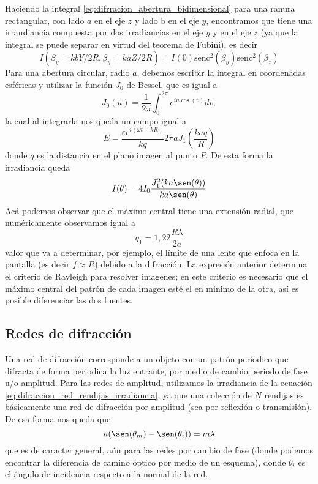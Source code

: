 \documentclass[a4paper,spanish]{article}
\numberwithin{equation}{section}
\begin{document}
	Haciendo la integral \ref{eq:difrracion_abertura_bidimensional} para una ranura rectangular, con lado $a$ en el eje $z$ y lado b en el eje $y$, encontramos que tiene una irrandiancia compuesta por dos irradiancias en el eje $y$ y en el eje $z$ (ya que la integral se puede separar en virtud del teorema de Fubini), es decir
	\begin{equation}
		I(\beta_y = k b Y / 2 R, \beta_y = k a Z / 2 R) = I(0) \text{senc}^2(\beta_y) \text{senc}^2(\beta_z)
	\end{equation}
	Para una abertura circular, radio $a$, debemos escribir la integral en coordenadas esf\'ericas y utilizar la funci\'on $J_0$ de Bessel, que es igual a \[J_0(u) = \frac{1}{2\pi} \int_0^{2\pi} e^{i u \cos(v)} dv,\] la cual al integrarla nos queda un campo igual a \[ E = \frac{\varepsilon e^{i(\omega t - k R)}}{k q} 2 \pi a J_1\left(\frac{k a q}{R}\right)\] donde $q$ es la distancia en el plano imagen al punto $P$. De esta forma la irradiancia queda 
	\begin{equation}
		I(\theta) = 4 I_0 \frac{J_1^2(k a \sen(\theta))}{k a \sen(\theta)}
		\label{eq:difraccion_circular_irradiancia}
	\end{equation}
	Ac\'a podemos observar que el m\'aximo central tiene una extensi\'on radial, que num\'ericamente observamos igual a 
	\begin{equation}
		q_1 = 1,22\frac{R\lambda}{2 a}
	\end{equation}
	valor que va a determinar, por ejemplo, el l\'imite de una lente que enfoca en la pantalla (es decir $f \approx R$) debido a la difracci\'on. 
	La expresi\'on anterior  determina el criterio de Rayleigh para resolver imagenes; en este criterio es necesario que el m\'aximo central del patr\'on de cada imagen est\'e el en minimo de la otra, as\'i es posible diferenciar las dos fuentes.
	\subsection{Redes de difracci\'on}
		Una red de difracci\'on corresponde a un objeto con un patr\'on periodico que difracta de forma periodica la luz entrante, por medio de cambio periodo de fase u/o amplitud. Para las redes de amplitud, utilizamos la irradiancia de la ecuaci\'on \ref{eq:difraccion_red_rendijas_irradiancia}, ya que una colecci\'on de $N$ rendijas es b\'asicamente una red de difracci\'on por amplitud (sea por reflexi\'on o transmisi\'on). De esa forma nos queda que
		\begin{equation}
			a (\sen(\theta_m) - \sen(\theta_i)) = m \lambda
			\label{eq:difraccion_red_ecuacion}
		\end{equation}
		que es de caracter general, a\'un para las redes por cambio de fase (donde podemos encontrar la diferencia de camino \'optico por medio de un esquema), donde $\theta_i$ es el \'angulo de incidencia respecto a la normal de la red.
		
\end{document}
